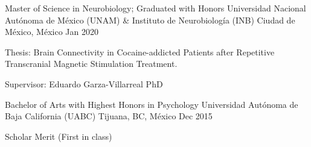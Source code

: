 \begin{cventries}
    \cventry
        {Master of Science in Neurobiology; Graduated with Honors}
        {Universidad Nacional Autónoma de México (UNAM) \& Instituto de
        Neurobiología (INB)}
        {Ciudad de México, México}
        {Jan 2020}
        {
            \begin{cvitems}
                \item {Thesis: Brain Connectivity in Cocaine-addicted Patients after Repetitive Transcranial Magnetic Stimulation Treatment.}
                \item {Supervisor: Eduardo Garza-Villarreal PhD}
            \end{cvitems}
        }
    \cventry
        {Bachelor of Arts with Highest Honors in Psychology}
        {Universidad Autónoma de Baja California (UABC)}
        {Tijuana, BC, México}
        {Dec 2015}
        {
            \begin{cvitems}
                \item {Scholar Merit (First in class)}
            \end{cvitems}
        }
\end{cventries}
